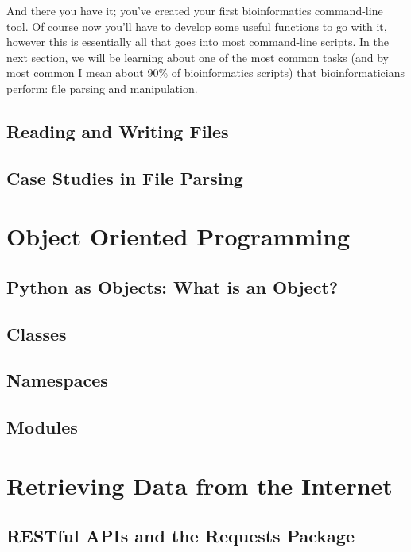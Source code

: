 \documentclass[a4paper,11pt]{article}
\begin{document}
And there you have it; you've created your first bioinformatics command-line tool.  Of 
course now you'll have to develop some useful functions to go with it, however this is 
essentially all that goes into most command-line scripts.  In the next section, we will 
be learning about one of the most common tasks (and by most common I mean about 90\% of 
bioinformatics scripts) that bioinformaticians perform: file parsing and manipulation.

\pagebreak
\subsection{Reading and Writing Files}

\pagebreak
\subsection{Case Studies in File Parsing}

\pagebreak
\section{Object Oriented Programming}
\subsection{Python as Objects: What is an Object?}

\pagebreak
\subsection{Classes}

\pagebreak
\subsection{Namespaces}

\pagebreak
\subsection{Modules}

\pagebreak
\section{Retrieving Data from the Internet}
\subsection{RESTful APIs and the Requests Package}
\end{document}
